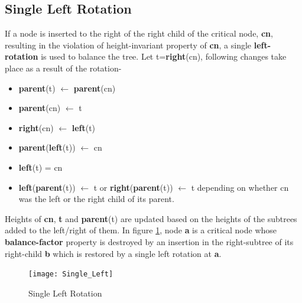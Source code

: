\documentclass[MTech]{iitmdiss}
\begin{document}
\subsection{Single Left Rotation}
If a node is inserted to the right of the right child of the critical node, \textbf{cn}, resulting in the violation of height-invariant property of \textbf{cn}, a single \textbf{left-rotation} is used to balance the tree. Let t=\textbf{right}(cn), following changes take place as a result of the rotation-
\begin{itemize}
    \item \textbf{parent}(t) $\leftarrow$ \textbf{parent}(cn)
    \item \textbf{parent}(cn) $\leftarrow$ t
    \item \textbf{right}(cn) $\leftarrow$ \textbf{left}(t)
    \item \textbf{parent}(\textbf{left}(t)) $\leftarrow$ cn
    \item \textbf{left}(t) = cn
    \item  \textbf{left}(\textbf{parent}(t)) $\leftarrow$ t or \textbf{right}(\textbf{parent}(t)) $\leftarrow$ t  depending on whether cn was the left or the right child of its parent.
\end{itemize}
Heights of \textbf{cn}, \textbf{t} and \textbf{parent}(t) are updated based on the heights of the subtrees added to the left/right of them. 
In figure \ref{fig:single_left}, node \textbf{a} is a critical node whose \textbf{balance-factor} property is destroyed by an insertion in the right-subtree of its right-child \textbf{b} which is restored by a single left rotation at \textbf{a}.

\begin{figure}
\centering
\texttt{[image: Single\_Left]}
\centering
\caption{Single Left Rotation}
\label{fig:single_left}
\end{figure} 
\end{document}
